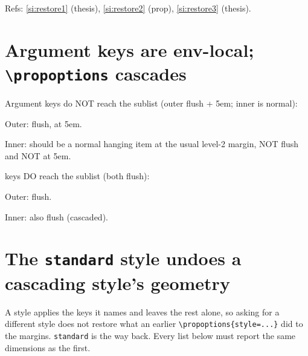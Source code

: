 \documentclass{article}
\begin{document}

Refs: \ref{si:restore1} (thesis), \ref{si:restore2} (prop), \ref{si:restore3} (thesis).

\section{Argument keys are env-local; \texttt{\textbackslash propoptions} cascades}



Argument keys do NOT reach the sublist (outer flush + 5em; inner is normal):
\begin{prop}[align=flush, leftmargin=5em]
  \item[name=Outer] Outer: flush, at 5em. \label{el:o1}
  \begin{prop}
    \item[name=Inner] Inner: should be a normal hanging item at the usual
    level-2 margin, NOT flush and NOT at 5em. \label{el:i1}
  \end{prop}
\end{prop}

\propoptions keys DO reach the sublist (both flush):
\begingroup
{}
\begin{prop}
  \item[name=Outer] Outer: flush. \label{el:o2}
  \begin{prop}
    \item[name=Inner] Inner: also flush (cascaded). \label{el:i2}
  \end{prop}
\end{prop}
\endgroup

\section{The \texttt{standard} style undoes a cascading style's geometry}

A style applies the keys it names and leaves the rest alone, so asking for a
different style does not restore what an earlier \verb|\propoptions{style=...}|
did to the margins.  \verb|standard| is the way back.  Every list below must
report the same dimensions as the first.
\end{document}
